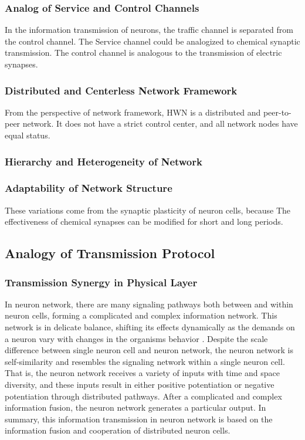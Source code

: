 \documentclass[journal,comsoc]{IEEEtran}
\begin{document}
			\subsubsection{Analog of Service and Control Channels}
				In the information transmission of neurons, the traffic channel is separated from the control channel.
				The Service channel could be analogized to chemical synaptic transmission. 			
				The control channel is analogous to the transmission of electric synapses. 
			
			\subsubsection{Distributed and Centerless Network Framework}
				From the perspective of network framework, HWN is a distributed and peer-to-peer network. 
				It does not have a strict control center, and all network nodes have equal status.
				
			
			\subsubsection{Hierarchy and Heterogeneity of Network}
			
			\subsubsection{Adaptability of Network Structure}
				These variations come from the synaptic plasticity of neuron cells, because The effectiveness of chemical synapses can be modified for short and long periods\cite{kandel2000principles}.
			
			
		\subsection{Analogy of Transmission Protocol}
		
			\subsubsection{Transmission Synergy in Physical Layer}
				In neuron network, there are many signaling pathways both between and within neuron cells, forming a complicated and complex information network. 
				This network is in delicate balance, shifting its effects dynamically as the demands on a neuron vary with changes in the organisms behavior \cite{bear2007neuroscience} .
				Despite the scale difference between single neuron cell and neuron network, the neuron network is self-similarity and resembles the signaling network within a single neuron cell. 
				That is, the neuron network receives a variety of inputs with time and space diversity, and these inputs result in either positive potentiation or negative potentiation through distributed pathways. 
				After a complicated and complex information fusion, the neuron network generates a particular output. 
				In summary, this information transmission in neuron network is based on the information fusion and cooperation of distributed neuron cells.
				
\end{document}
